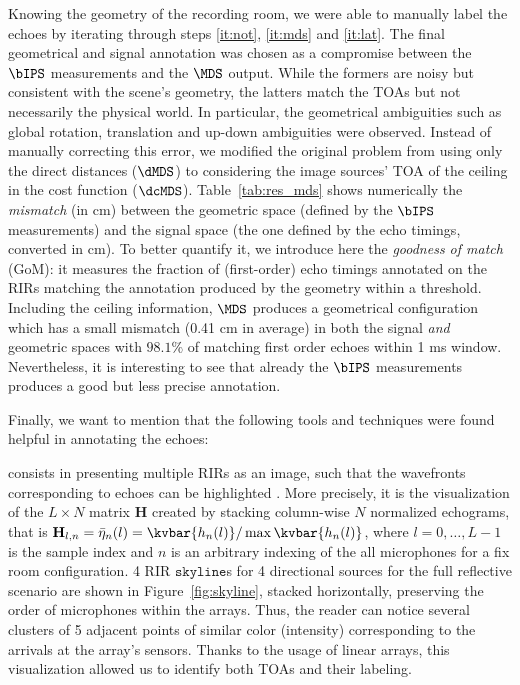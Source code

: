 Knowing the geometry of the recording room, we were able to manually label the echoes by iterating through steps \ref{it:not}, \ref{it:mds} and \ref{it:lat}.
The final geometrical and signal annotation was chosen as a compromise between the $\bIPS$ measurements and the $\MDS$ output. While the formers are noisy but consistent with the scene's geometry, the latters match the TOAs but not necessarily the physical world. In particular, the geometrical ambiguities such as global rotation, translation and up-down ambiguities were observed. Instead of manually correcting this error, we modified the original problem from using only the direct distances ($\dMDS$) to considering the  image sources' TOA of the ceiling in the cost function ($\dcMDS$). Table~\ref{tab:res_mds} shows numerically the \textit{mismatch} (in cm) between the geometric space (defined by the $\bIPS$ measurements) and the signal space (the one defined by the echo timings, converted in cm).  To better quantify it, we introduce here the \textit{goodness of match} (GoM): it measures the fraction of (first-order) echo timings annotated on the RIRs matching the annotation produced by the geometry within a threshold. Including the ceiling information, $\MDS$ produces a geometrical configuration which has a small mismatch (0.41 cm in average) in both the signal \textit{and} geometric spaces with $98.1\%$ of matching first order echoes within 1 ms window. Nevertheless, it is interesting to see that already the $\bIPS$ measurements produces a good but less precise annotation.



Finally, we want to mention that the following tools and techniques were found helpful in annotating the echoes:

 consists in presenting multiple RIRs as an image, such that the wavefronts corresponding to echoes can be highlighted \cite{Baba2018b}. More precisely, it is the visualization of the $L \times N$ matrix $\mathbf{H}$ created by stacking column-wise $N$ normalized echograms, that is $\mathbf{H}_{l, n} =\bar{\eta}_{n}(l) = \kvbar{h_{n}(l)}/\max{\kvbar{h_{n}(l)}}$, where $l = 0, \dots, L-1$ is  the sample index and $n$ is an arbitrary indexing of the all microphones for a fix room configuration. 4 RIR $\mathtt{skyline}$s for 4 directional sources for the full reflective scenario are shown in Figure~\ref{fig:skyline}, stacked horizontally, preserving the order of microphones within the arrays. Thus, the reader can notice several clusters of 5 adjacent points of similar color (intensity) corresponding to the arrivals at the array's sensors. Thanks to the usage of linear arrays, this visualization allowed us to identify both TOAs and their labeling.

